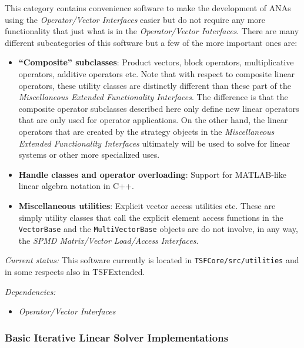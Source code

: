 \documentclass[pdf,ps2pdf,11pt]{SANDreport}
\begin{document}
This category contains convenience software to make the development of ANAs
using the {}\textit{Operator/Vector Interfaces} easier but do not require
any more functionality that just what is in the {}\textit{Operator/Vector
Interfaces}.  There are many different subcategories of this software but a
few of the more important ones are:

\begin{itemize}

{}\item{}\textbf{``Composite'' subclasses}: Product vectors, block operators,
multiplicative operators, additive operators etc.  Note that with respect to
composite linear operators, these utility classes are distinctly different
than these part of the {}\textit{Miscellaneous Extended Functionality
Interfaces}.  The difference is that the composite operator subclasses
described here only define new linear operators that are only used for
operator applications.  On the other hand, the linear operators that are
created by the strategy objects in the {}\textit{Miscellaneous Extended
Functionality Interfaces} ultimately will be used to solve for linear systems
or other more specialized uses.

{}\item{}\textbf{Handle classes and operator overloading}: Support for
MATLAB-like linear algebra notation in C++.

{}\item{}\textbf{Miscellaneous utilities}: Explicit vector access utilities
etc.  These are simply utility classes that call the explicit element access
functions in the {}\texttt{Vector\-Base} and the
{}\texttt{Multi\-Vector\-Base} objects are do not involve, in any way, the
{}\textit{{SPMD Matrix/Vector Load/Access Interfaces}}.

\end{itemize}

{}\textit{Current status:} This software currently is located in
{}\texttt{TSFCore/src/utilities} and in some respects also in TSFExtended.

{}\textit{Dependencies:}
\begin{itemize}
{}\item{}\textit{Operator/Vector Interfaces}
\end{itemize}

%
\subsubsection{Basic Iterative Linear Solver Implementations}
%
\end{document}
